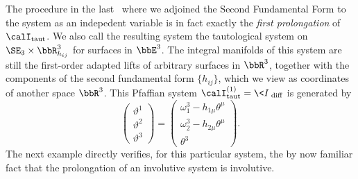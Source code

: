 The procedure in the last \sect\ where we adjoined the Second Fundamental Form to the system as an indepedent variable is in fact exactly the \emph{first prolongation} of $\calI_{\mathrm{taut}}$. We also call the resulting system the tautological system on $\SE_3\times\bbR^3_{h_{ij}}$ for surfaces in $\bbE^3$. The integral manifolds of this system are still the first-order adapted lifts of arbitrary surfaces in $\bbR^3$, together with the components of the second fundamental form $\{h_{ij}\}$, which we view as coordinates of another space $\bbR^3$. This Pfaffian system $\calI^{(1)}_{\mathrm{taut}}=\<I\>_{\mathrm{diff}}$ is generated by 
\[\begin{pmatrix}
    \vartheta^1\\
    \vartheta^2\\
    \vartheta^3
\end{pmatrix}=
\begin{pmatrix}
    \omega^3_1-h_{1\mu}\theta^\mu\\
    \omega^3_2-h_{2\mu}\theta^\mu\\
    \theta^3
\end{pmatrix}.\]
The next example directly verifies, for this particular system, the by now familiar fact that the prolongation of an involutive system is involutive. 

